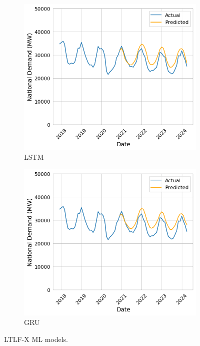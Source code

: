 \documentclass[12pt]{scrreprt}
\begin{document}
\begin{figure}[b!]
    \centering
    \begin{subfigure}{.5\textwidth}
        \centering
        \includegraphics[width=\linewidth]{Images/ltmc_plot.png}
        \caption{LSTM}
        \label{fig:ltmc_plot}
    \end{subfigure}%
    \begin{subfigure}{.5\textwidth}
        \centering
        \includegraphics[width=\linewidth]{Images/gltmc_plot.png}
        \caption{GRU}
        \label{fig:gltmc_plot}
    \end{subfigure}
    \caption{LTLF-X ML models.}
    \label{fig:ltlfx_ml}
\end{figure}
\end{document}
